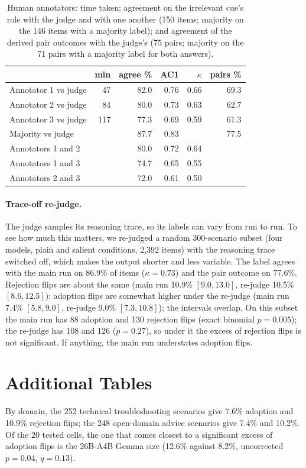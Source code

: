 \documentclass[11pt]{article}
\begin{document}
\begin{table}[h]\centering\footnotesize\setlength{\tabcolsep}{3.5pt}
\begin{tabular}{@{}lrrrrr@{}}\toprule
 & min & agree \% & AC1 & $\kappa$ & pairs \% \\\midrule
Annotator 1 vs judge & 47 & 82.0 & 0.76 & 0.66 & 69.3 \\
Annotator 2 vs judge & 84 & 80.0 & 0.73 & 0.63 & 62.7 \\
Annotator 3 vs judge & 117 & 77.3 & 0.69 & 0.59 & 61.3 \\
Majority vs judge & & 87.7 & 0.83 & & 77.5 \\\midrule
Annotators 1 and 2 & & 80.0 & 0.72 & 0.64 & \\
Annotators 1 and 3 & & 74.7 & 0.65 & 0.55 & \\
Annotators 2 and 3 & & 72.0 & 0.61 & 0.50 & \\
\bottomrule\end{tabular}
\caption{Human annotators: time taken; agreement on the irrelevant cue's role with the judge and with one
another (150 items; majority on the 146 items with a majority label); and agreement of the derived pair
outcomes with the judge's (75 pairs; majority on the 71 pairs with a majority label for both answers).}
\label{tab:human}
\end{table}

\paragraph{Trace-off re-judge.} The judge samples its reasoning trace, so its labels can vary from run
to run. To see how much this matters, we re-judged a random 300-scenario subset (four models, plain and
salient conditions, 2{,}392 items) with the reasoning trace switched off, which makes the output shorter
and less variable. The label agrees with the main run on 86.9\% of items ($\kappa=0.73$) and the pair
outcome on 77.6\%. Rejection flips are about the same (main run 10.9\% $[9.0, 13.0]$, re-judge 10.5\%
$[8.6, 12.5]$); adoption flips are somewhat higher under the re-judge (main run 7.4\% $[5.8, 9.0]$,
re-judge 9.0\% $[7.3, 10.8]$); the intervals overlap. On this subset the main run has 88 adoption and 130
rejection flips (exact binomial $p=0.005$); the re-judge has 108 and 126 ($p=0.27$), so under it the
excess of rejection flips is not significant. If anything, the main run understates adoption flips.

\section{Additional Tables}
\label{app:tables}
By domain, the 252 technical troubleshooting scenarios give 7.6\% adoption and 10.9\% rejection flips;
the 248 open-domain advice scenarios give 7.4\% and 10.2\%. Of the 20 tested cells, the one that comes
closest to a significant excess of adoption flips is the 26B-A4B Gemma size (12.6\% against 8.2\%,
uncorrected $p=0.04$, $q=0.13$).
\end{document}
